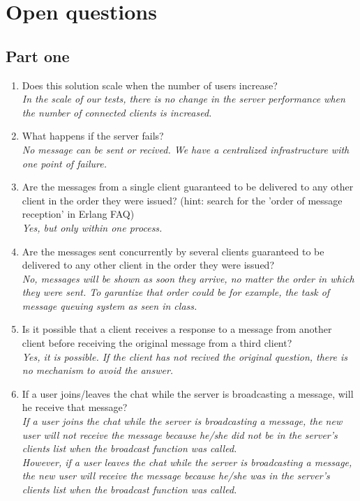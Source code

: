 \clearpage
\section{Open questions}

\subsection{Part one}

\renewcommand{\labelenumi}{\roman{enumi}}
\begin{enumerate}
\item Does this solution scale when the number of users increase? \\
\textit{In the scale of our tests, there is no change in the server performance when the number of connected clients is increased.}

\item What happens if the server fails? \\
\textit{No message can be sent or recived. We have a centralized infrastructure with one point of failure.}

\item Are the messages from a single client guaranteed to be delivered to any other client in the order they were issued? (hint: search for the ’order of message reception’ in Erlang FAQ) \\
\textit{Yes, but only within one process.}

\item Are the messages sent concurrently by several clients guaranteed to be delivered to any other client in the order they were issued? \\
\textit{No, messages will be shown as soon they arrive, no matter the order in which they were sent. To garantize that order could be for example, the task of message queuing system as seen in class.}

\item Is it possible that a client receives a response to a message from another client before receiving the original message from a third client? \\
\textit{Yes, it is possible. If the client has not recived the original question, there is no mechanism to avoid the answer.}

\item If a user joins/leaves the chat while the server is broadcasting a message, will he receive that message? \\
\textit{If a user joins the chat while the server is broadcasting a message, the new user will not receive the message because he/she did not be in the server's clients list when the broadcast function was called.\\
However, if a user leaves the chat while the server is broadcasting a message, the new user will receive the message because he/she was in the server's clients list when the broadcast function was called.}
\end{enumerate}


